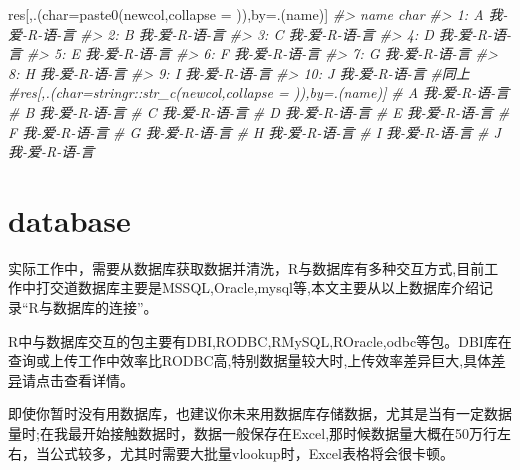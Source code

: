 \documentclass[
]{book}
\newenvironment{Shaded}{\begin{snugshade}}{\end{snugshade}}
\newcommand{\AttributeTok}[1]{\textcolor[rgb]{0.77,0.63,0.00}{#1}}
\newcommand{\CommentTok}[1]{\textcolor[rgb]{0.56,0.35,0.01}{\textit{#1}}}
\newcommand{\FunctionTok}[1]{\textcolor[rgb]{0.00,0.00,0.00}{#1}}
\newcommand{\NormalTok}[1]{#1}
\newcommand{\OtherTok}[1]{\textcolor[rgb]{0.56,0.35,0.01}{#1}}
\newcommand{\StringTok}[1]{\textcolor[rgb]{0.31,0.60,0.02}{#1}}
\begin{document}
\begin{Shaded}
\begin{Highlighting}[]
\NormalTok{res[,.(}\AttributeTok{char=}\FunctionTok{paste0}\NormalTok{(newcol,}\AttributeTok{collapse =} \StringTok{\textquotesingle{}{-}\textquotesingle{}}\NormalTok{)),by}\OtherTok{=}\NormalTok{.(name)]}
\CommentTok{\#\textgreater{}     name          char}
\CommentTok{\#\textgreater{}  1:    A 我{-}爱{-}R{-}语{-}言}
\CommentTok{\#\textgreater{}  2:    B 我{-}爱{-}R{-}语{-}言}
\CommentTok{\#\textgreater{}  3:    C 我{-}爱{-}R{-}语{-}言}
\CommentTok{\#\textgreater{}  4:    D 我{-}爱{-}R{-}语{-}言}
\CommentTok{\#\textgreater{}  5:    E 我{-}爱{-}R{-}语{-}言}
\CommentTok{\#\textgreater{}  6:    F 我{-}爱{-}R{-}语{-}言}
\CommentTok{\#\textgreater{}  7:    G 我{-}爱{-}R{-}语{-}言}
\CommentTok{\#\textgreater{}  8:    H 我{-}爱{-}R{-}语{-}言}
\CommentTok{\#\textgreater{}  9:    I 我{-}爱{-}R{-}语{-}言}
\CommentTok{\#\textgreater{} 10:    J 我{-}爱{-}R{-}语{-}言}
\CommentTok{\#同上}
\CommentTok{\#res[,.(char=stringr::str\_c(newcol,collapse = \textquotesingle{}{-}\textquotesingle{})),by=.(name)]}
\CommentTok{\# A 我{-}爱{-}R{-}语{-}言           }
\CommentTok{\# B 我{-}爱{-}R{-}语{-}言           }
\CommentTok{\# C 我{-}爱{-}R{-}语{-}言           }
\CommentTok{\# D 我{-}爱{-}R{-}语{-}言           }
\CommentTok{\# E 我{-}爱{-}R{-}语{-}言           }
\CommentTok{\# F 我{-}爱{-}R{-}语{-}言           }
\CommentTok{\# G 我{-}爱{-}R{-}语{-}言           }
\CommentTok{\# H 我{-}爱{-}R{-}语{-}言           }
\CommentTok{\# I 我{-}爱{-}R{-}语{-}言           }
\CommentTok{\# J 我{-}爱{-}R{-}语{-}言}
\end{Highlighting}
\end{Shaded}

\hypertarget{database}{%
\chapter{database}\label{database}}

实际工作中，需要从数据库获取数据并清洗，R与数据库有多种交互方式,目前工作中打交道数据库主要是MSSQL,Oracle,mysql等,本文主要从以上数据库介绍记录``R与数据库的连接''。

R中与数据库交互的包主要有DBI,RODBC,RMySQL,ROracle,odbc等包。DBI库在查询或上传工作中效率比RODBC高,特别数据量较大时,上传效率差异巨大,具体\href{https://github.com/r-dbi/odbc}{差异}请点击查看详情。

即使你暂时没有用数据库，也建议你未来用数据库存储数据，尤其是当有一定数据量时;在我最开始接触数据时，数据一般保存在Excel,那时候数据量大概在50万行左右，当公式较多，尤其时需要大批量vlookup时，Excel表格将会很卡顿。
\end{document}
